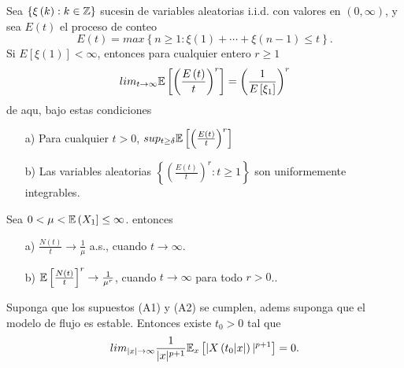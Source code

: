 \begin{Lema}\label{Lema.5.2.Gut}
Sea $\left\{\xi\left(k\right):k\in\mathbb{Z}\right\}$ sucesin de
variables aleatorias i.i.d. con valores en
$\left(0,\infty\right)$, y sea $E\left(t\right)$ el proceso de
conteo
\[E\left(t\right)=max\left\{n\geq1:\xi\left(1\right)+\cdots+\xi\left(n-1\right)\leq t\right\}.\]
Si $E\left[\xi\left(1\right)\right]<\infty$, entonces para
cualquier entero $r\geq1$
\begin{equation}
lim_{t\rightarrow\infty}\mathbb{E}\left[\left(\frac{E\left(t\right)}{t}\right)^{r}\right]=\left(\frac{1}{E\left[\xi_{1}\right]}\right)^{r}
\end{equation}
de aqu, bajo estas condiciones
\begin{itemize}
\item[a)] Para cualquier $t>0$,
$sup_{t\geq\delta}\mathbb{E}\left[\left(\frac{E\left(t\right)}{t}\right)^{r}\right]$

\item[b)] Las variables aleatorias
$\left\{\left(\frac{E\left(t\right)}{t}\right)^{r}:t\geq1\right\}$
son uniformemente integrables.
\end{itemize}
\end{Lema}

\begin{Teo}\label{Tma.5.1.Gut} Sea
$0<\mu<\mathbb{E}\left(X_{1}\right]\leq\infty$. entonces

\begin{itemize}
\item[a)] $\frac{N\left(t\right)}{t}\rightarrow\frac{1}{\mu}$
a.s., cuando $t\rightarrow\infty$.


\item[b)]$\mathbb{E}\left[\frac{N\left(t\right)}{t}\right]^{r}\rightarrow\frac{1}{\mu^{r}}$,
cuando $t\rightarrow\infty$ para todo $r>0$..
\end{itemize}
\end{Teo}


\begin{Prop}\label{Prop.5.1}
Suponga que los supuestos (A1) y (A2) se cumplen, adems suponga
que el modelo de flujo es estable. Entonces existe $t_{0}>0$ tal
que
\begin{equation}\label{Eq.Prop.5.1}
lim_{|x|\rightarrow\infty}\frac{1}{|x|^{p+1}}\mathbb{E}_{x}\left[|X\left(t_{0}|x|\right)|^{p+1}\right]=0.
\end{equation}

\end{Prop}


